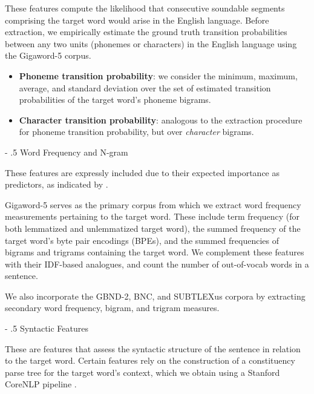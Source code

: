 \documentclass[11pt,a4paper]{article}
\makeatletter
\renewcommand\paragraph{%
    \@startsection{paragraph}{4}{0mm}%
        {-\baselineskip}%
        {.5\baselineskip}%
        {\normalfont\normalsize\bfseries}}
\makeatother
\begin{document}
These features compute the likelihood that consecutive soundable segments comprising the target word would arise in the English language. Before extraction, we empirically estimate the ground truth transition probabilities between any two units (phonemes or characters) in the English language using the Gigaword-5 corpus. 

\begin{itemize}
  \item \textbf{Phoneme transition probability}: we consider the minimum, maximum, average, and standard deviation over the set of estimated transition probabilities of the target word's phoneme bigrams.
  \item \textbf{Character transition probability}: analogous to the extraction procedure for phoneme transition probability, but over \textit{character} bigrams.
\end{itemize}

\paragraph{Word Frequency and N-gram}

These features are expressly included due to their expected importance as predictors, as indicated by \citet{zampieriEtAl:2017:NLPTEA}.

Gigaword-5 serves as the primary corpus from which we extract word frequency measurements pertaining to the target word. These include term frequency (for both lemmatized and unlemmatized target word), the summed frequency of the target word's byte pair encodings (BPEs), and the summed frequencies of bigrams and trigrams containing the target word. We complement these features with their IDF-based analogues, and count the number of out-of-vocab words in a sentence.

We also incorporate the GBND-2, BNC, and SUBTLEXus corpora by extracting secondary word frequency, bigram, and trigram measures. 

\paragraph{Syntactic Features}

These are features that assess the syntactic structure of the sentence in relation to the target word. Certain features rely on the construction of a constituency parse tree for the target word's context, which we obtain using a Stanford CoreNLP pipeline \citep{manning-EtAl:2014:P14-5}.
\end{document}
